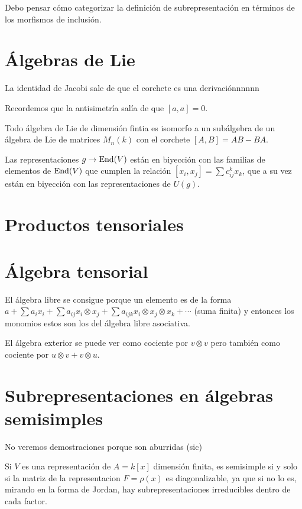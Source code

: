 \documentclass[ANAyTR.tex]{subfiles}
\begin{document}
Debo pensar cómo categorizar la definición de subrepresentación en términos de los morfismos de inclusión. 

\section{Álgebras de Lie}
La identidad de Jacobi sale de que el corchete es una derivaciónnnnnn

Recordemos que la antisimetría salía de que $[a,a]=0$.

\begin{teorema}
Todo álgebra de Lie de dimensión fintia es isomorfo a un subálgebra de un álgebra de Lie de matrices $M_n(k)$ con el corchete $[A,B]=AB-BA$. 
\end{teorema}


Las representaciones $g\to\operatorname{End}(V)$ están en biyección con las familias de elementos de $\operatorname{End}(V)$ que cumplen la relación $[x_i,x_j]=\sum c_{ij}^kx_k$, que a su vez están en biyección con las representaciones de $U(g)$. 


\section{Productos tensoriales}

\section{Álgebra tensorial}
El álgebra libre se consigue porque un elemento es de la forma $a+\sum a_i x_i+\sum a_{ij}x_i\otimes x_j+\sum a_{ijk}x_i\otimes x_j\otimes x_k+\cdots$ (suma finita) y entonces los monomios estos son los del álgebra libre asociativa. 

El álgebra exterior se puede ver como cociente por $v\otimes v$ pero también como cociente por $u\otimes v+v\otimes u$. 

\section{Subrepresentaciones en álgebras semisimples}

No veremos demostraciones porque son aburridas (sic)

Si $V$ es una representación de $A=k[x]$ dimensión finita, es semisimple si y solo si la matriz de la representacion $F=\rho(x)$ es diagonalizable, ya que si no lo es, mirando en la forma de Jordan, hay subrepresentaciones irreducibles dentro de cada factor. 
\end{document}
